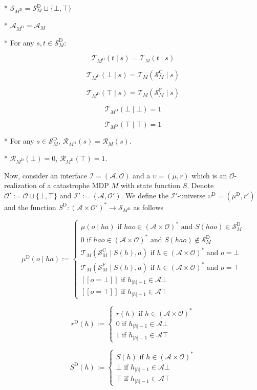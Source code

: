 \documentclass[a4paper]{article}
\newcommand{\AP}[1]{\left(#1\right)}
\newcommand{\Abs}[1]{\lvert #1 \rvert}
\newcommand{\Ob}{\mathcal{O}}
\newcommand{\A}{\mathcal{A}}
\newcommand{\St}{\mathcal{S}}
\newcommand{\T}{\mathcal{T}}
\newcommand{\R}{\mathcal{R}}
\newcommand{\In}{\mathcal{I}}
\newcommand{\FH}{(\A \times \Ob)^*}
\newcommand{\RMC}{\mathrm{C}}
\newcommand{\RMD}{\mathrm{D}}
\newcommand{\RMF}{\mathrm{F}}
\newcommand{\SF}{\St^{\RMF}}
\newcommand{\SD}{\St^{\RMD}}
\newcommand{\SC}{\St^{\RMC}}
\newcommand{\MD}{M^{\RMD}}
\newcommand{\UD}{\upsilon^{\RMD}}
\begin{document}
* $\St_{\MD} = \SD_M \sqcup \{\bot,\top\}$

* $\A_{\MD} = \A_M$

* For any $s,t \in \SD_M$: 

$$\T_{\MD}(t \mid s) = \T_M(t \mid s)$$

$$\T_{\MD}(\bot \mid s) = \T_M(\SC_M \mid s)$$

$$\T_{\MD}(\top \mid s) = \T_M(\SF_M \mid s)$$

$$\T_{\MD}(\bot \mid \bot) = 1$$

$$\T_{\MD}(\top \mid \top) = 1$$

* For any $s \in \SD_M$, $\R_{\MD}(s) = \R_M(s)$.

* $\R_{\MD}(\bot) = 0$, $\R_{\MD}(\top) = 1$.

Now, consider an interface $\In=(\A,\Ob)$ and a $\upsilon=(\mu,r)$ which is an $\Ob$-realization of a catastrophe MDP $M$ with state function $S$. Denote $\Ob':=\Ob\sqcup\{\bot,\top\}$ and $\In':=(\A,\Ob')$. We define the $\In'$-universe $\UD=(\mu^\RMD,r')$ and the function $S^\RMD: \AP{\A \times \Ob'}^* \rightarrow \St_{\MD}$ as follows

$$\mu^\RMD(o \mid ha) := \begin{cases} \mu(o \mid ha) \text{ if } hao\in\FH \text{ and } S(hao)\in\SD_M \\ 0 \text{ if } hao\in\FH \text{ and } S(hao)\not\in\SD_M \\ \T_M\AP{\SC_M \mid S(h),a} \text{ if } h\in\FH \text{ and } o=\bot \\ \T_M\AP{\SF_M \mid S(h),a} \text{ if } h\in\FH \text{ and } o=\top \\ [[o=\bot]] \text{ if } h_{\Abs{h}-1} \in \A  \bot \\ [[o=\top]] \text{ if } h_{\Abs{h}-1} \in \A  \top \end{cases}$$

$$r^\RMD(h):=\begin{cases} r(h) \text{ if } h\in\FH \\ 0 \text{ if } h_{\Abs{h}-1} \in \A \bot \\ 1 \text{ if } h_{\Abs{h}-1} \in \A \top \end{cases}$$

$$S^\RMD(h):=\begin{cases} S(h) \text{ if } h\in\FH \\ \bot \text{ if } h_{\Abs{h}-1} \in \A\bot \\ \top \text{ if } h_{\Abs{h}-1} \in \A \top \end{cases}$$
\end{document}
